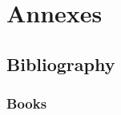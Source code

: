 \documentclass[11pt,fleqn]{book} %
\begin{document}





\part{Annexes}









\chapter*{Bibliography}
\section*{Books}
\printbibliography[heading=bibempty,type=book]
\end{document}
